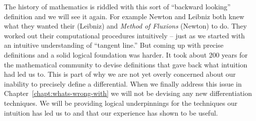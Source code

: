 The history of mathematics is riddled with this sort of ``backward
looking'' definition and we will see it again. For example Newton and
Leibniz both knew what they wanted their  (Leibniz) and \emph{Method of Fluxions} (Newton) to
do. They worked out their computational procedures intuitively -- just
as we started with an intuitive understanding of ``tangent line.'' But
coming up with precise definitions and a solid logical foundation was
harder. It took about $200$ years for the mathematical community to
devise definitions that gave back what intuition had led us to. This
is part of why we are not yet overly concerned about our inability to
precisely define a differential. When we finally address this issue in
Chapter~\ref{chapt:whats-wrong-with} we will not be devising any new
differentiation techniques. We will be providing logical underpinnings
for the techniques our intuition has led us to and that our experience
has shown to be useful.

